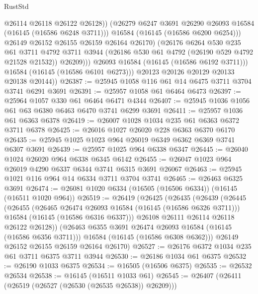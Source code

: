 \begin{lexlean}{RustStd}
\begin{coremodule}
                        @26114
                        @26118
                        @26122
                        @26128))
                    (@26279 @6247 @3691 @26290 @26093 @16584 (@16145 (@16586 @6248 @3711)))
                    @16584
                    (@16145 (@16586 @6200 @6254)))
                  @26149
                  @26152
                  @26155
                  @26159
                  @26164
                  @26170)
                (@26176
                  @6264
                  @530
                  @235
                  @61
                  @3711
                  @4792
                  @3711
                  @3944
                  (@26186 @530 @61 @4792 (@26190 @529 @4792 @21528 @21532))
                  @26209)))
            @26093
            @16584
            (@16145 (@16586 @6192 @3711)))
          @16584
          (@16145 (@16586 @6101 @6273)))
        @20123
        @20126
        @20129
        @20133
        @20138
        @20144))
@26387 := @25945 @1058 @116 @61 @14 @6475 @3711 @3704 @3741 @6291 @3691
@26391 := @25957 @1058 @61 @6464 @6473
@26397 := @25964 @1057 @330 @61 @6464 @6471 @4344
@26407 := @25945 @1036 @1056 @61 @63 @6380 @6463 @6470 @3741 @6299 @3691
@26411 := @25957 @1036 @61 @6363 @6378
@26419 := @26007 @1028 @1034 @235 @61 @6363 @6372 @3711 @6378
@26425 := @26016 @1027 @26020 @228 @6363 @6370 @6170
@26435 := @25945 @1025 @1023 @964 @26019 @6349 @6362 @6369 @3741 @6307 @3691
@26439 := @25957 @1025 @964 @6338 @6347
@26445 := @26040 @1024 @26020 @964 @6338 @6345 @6142
@26455 := @26047 @1023 @964 @26019 @4290 @6337 @6344 @3741 @6315 @3691 @26067
@26463 := @25945 @1021 @116 @964 @14 @6334 @3711 @3704 @3741
@26465 := @26463 @6325 @3691
@26474 := @26081 @1020 @6334 (@16505 (@16506 @6334)) (@16145 (@16511 @1020 @964))
@26519 := @26419
    (@26425
      (@26435
        (@26439
          (@26445
            (@26455
              (@26465 @26474 @26093 @16584 (@16145 (@16586 @6326 @3711)))
              @16584
              (@16145 (@16586 @6316 @6337)))
            @26108
            @26111
            @26114
            @26118
            @26122
            @26128))
        (@26463 @6355 @3691 @26474 @26093 @16584 (@16145 (@16586 @6356 @3711)))
        @16584
        (@16145 (@16586 @6308 @6362)))
      @26149
      @26152
      @26155
      @26159
      @26164
      @26170)
@26527 := @26176 @6372 @1034 @235 @61 @3711 @6375 @3711 @3944
@26530 := @26186 @1034 @61 @6375
@26532 := @26190 @1033 @6375
@26534 := @16505 (@16506 @6375)
@26535 := @26532 @26534
@26538 := @16145 (@16511 @1033 @61)
@26545 := @26407 (@26411 (@26519 (@26527 (@26530 (@26535 @26538)) @26209)))

\end{coremodule}
\end{lexlean}
